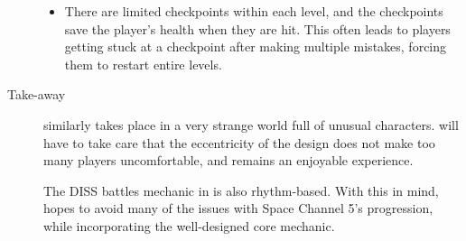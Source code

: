 \begin{description}
{\begin{itemize}
\item{There are limited checkpoints within each level, and the checkpoints save the player's health when they are hit. This often leads to players getting stuck at a checkpoint after making multiple mistakes, forcing them to restart entire levels.}
\end{itemize}
}
\item[Take-away]{\ourgame{} similarly takes place in a very strange world full of unusual characters. \ourteam{} will have to take care that the eccentricity of the design does not make too many players uncomfortable, and remains an enjoyable experience.

The DISS battles mechanic in \ourgame{} is also rhythm-based. With this in mind, \ourteam{} hopes to avoid many of the issues with Space Channel 5's progression, while incorporating the well-designed core mechanic.}
\end{description}


\clearpage
